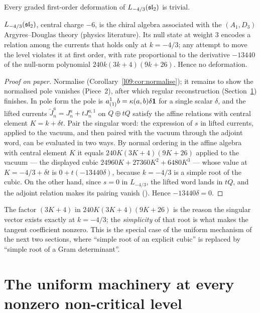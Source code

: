 \begin{theorem}\label{l09:thm:L43}
Every graded first-order deformation of $L_{-4/3}(\mathfrak{sl}_2)$ is trivial.
\end{theorem}
\begin{physics}
$L_{-4/3}(\mathfrak{sl}_2)$, central charge $-6$, is the chiral algebra associated with the $(A_1,D_3)$ Argyres--Douglas
theory (physics literature). Its null state at weight 3 encodes a relation among the currents that holds
only at $k=-4/3$; any attempt to move the level violates it at first order, with rate proportional to the
derivative $-13440$ of the null-norm polynomial $240k(3k+4)(9k+26)$. Hence no deformation.
\end{physics}


\begin{proof}[Proof on paper]
Normalise (Corollary~\ref{l09:cor:normalise}); it remains to show the normalised pole vanishes
(Piece~2), after which regular reconstruction (Section~\ref{l09:sec:uniform}) finishes. In pole form the
pole is $a^1_{(1)}b = \kappa(a,b)\delta\mathbf{1}$ for a single scalar $\delta$, and the lifted currents
$\tilde J^a_n = J^a_n + tJ^{a,1}_n$ on $Q\oplus tQ$ satisfy the affine relations with central element
$K = k + \delta t$. Pair the singular word: the expression of $s$ in lifted currents, applied to the
vacuum, and then paired with the vacuum through the adjoint word, can be evaluated in two ways. By
normal ordering in the affine algebra with central element $K$ it equals
$240K(3K+4)(9K+26)$ applied to the vacuum --- the displayed cubic $24960K + 27360K^2 + 6480K^3$ ---
whose value at $K = -4/3 + \delta t$ is $0 + t(-13440\delta)$, because $k=-4/3$ is a simple root of the
cubic. On the other hand, since $s=0$ in $L_{-4/3}$, the lifted word lands in $tQ$, and the adjoint
relation makes its pairing vanish (). Hence
$-13440\delta = 0$.
\end{proof}

The factor $(3K+4)$ in $240K(3K+4)(9K+26)$ is the reason the singular vector exists exactly at
$k=-4/3$; the \emph{simplicity} of that root is what makes the tangent coefficient nonzero. This is
the special case of the uniform mechanism of the next two sections, where ``simple root of an
explicit cubic'' is replaced by ``simple root of a Gram determinant''.

\section{The uniform machinery at every nonzero non-critical level}\label{l09:sec:uniform}

